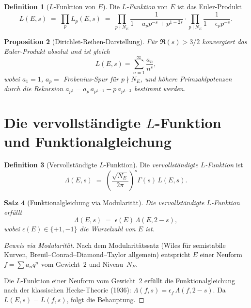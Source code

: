 \documentclass[12pt,a4paper]{amsart}
\newtheorem{theorem}{Satz}[section]
\newtheorem{proposition}[theorem]{Proposition}
\theoremstyle{definition}
\newtheorem{definition}[theorem]{Definition}
\begin{document}
\begin{definition}[$L$-Funktion von $E$]
\label{def:L_function}
Die \emph{$L$-Funktion} von $E$ ist das Euler-Produkt
\[
  L(E,s) \;=\; \prod_p L_p(E,s)
  \;=\; \prod_{p \nmid N_E} \frac{1}{1 - a_p p^{-s} + p^{1-2s}}
        \cdot \prod_{p \mid N_E} \frac{1}{1 - \epsilon_p p^{-s}}.
\]
\end{definition}

\begin{proposition}[Dirichlet-Reihen-Darstellung]
\label{prop:dirichlet}
F\"ur $\Re(s) > 3/2$ konvergiert das Euler-Produkt absolut und ist gleich
\[
  L(E,s) = \sum_{n=1}^{\infty} \frac{a_n}{n^s},
\]
wobei $a_1 = 1$, $a_p = $ Frobenius-Spur f\"ur $p \nmid N_E$,
und h\"ohere Primzahlpotenzen durch die Rekursion
$a_{p^k} = a_p\,a_{p^{k-1}} - p\,a_{p^{k-2}}$ bestimmt werden.
\end{proposition}

\section{Die vervollst\"andigte $L$-Funktion und Funktionalgleichung}

\begin{definition}[Vervollst\"andigte $L$-Funktion]
\label{def:completed_L}
Die \emph{vervollst\"andigte $L$-Funktion} ist
\[
  \Lambda(E,s) \;=\; \left(\frac{\sqrt{N_E}}{2\pi}\right)^s
  \Gamma(s)\,L(E,s).
\]
\end{definition}

\begin{theorem}[Funktionalgleichung via Modularit\"at]
\label{thm:functional_eq}
Die vervollst\"andigte $L$-Funktion erf\"ullt
\begin{equation}
  \label{eq:functional}
  \Lambda(E,s) \;=\; \epsilon(E)\,\Lambda(E,2-s),
\end{equation}
wobei $\epsilon(E) \in \{+1,-1\}$ die \emph{Wurzelzahl} von $E$ ist.
\end{theorem}

\begin{proof}[Beweis via Modularit\"at]
Nach dem Modularit\"atssatz
(Wiles \cite{Wiles1995} f\"ur semistabile Kurven,
Breuil--Conrad--Diamond--Taylor \cite{BCDT2001} allgemein)
entspricht $E$ einer Neuform $f = \sum a_n q^n$ vom Gewicht~$2$ und
Niveau~$N_E$.

Die $L$-Funktion einer Neuform vom Gewicht~$2$ erf\"ullt die
Funktionalgleichung nach der klassischen Hecke-Theorie (1936):
$\Lambda(f,s) = \epsilon_f\,\Lambda(f,2-s)$.
Da $L(E,s) = L(f,s)$, folgt die Behauptung.
\end{proof}
\end{document}
